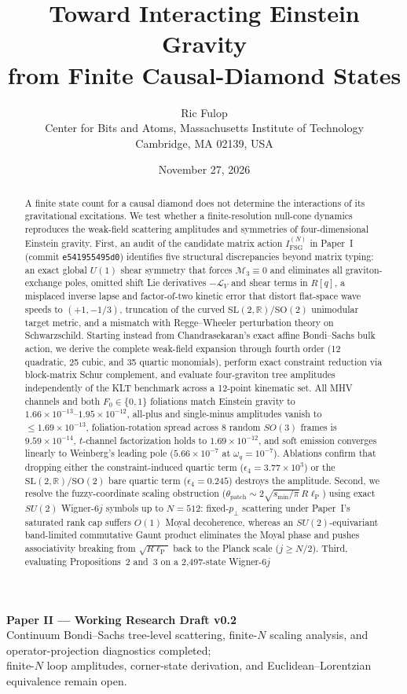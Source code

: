 \documentclass[11pt]{article}
\title{\textbf{Toward Interacting Einstein Gravity\\from Finite Causal-Diamond States}}
\author{Ric Fulop\\
Center for Bits and Atoms, Massachusetts Institute of Technology\\
Cambridge, MA 02139, USA}
\date{November 27, 2026}
\newcommand{\lP}{\ell_{\mathrm{P}}}
\newcommand{\calM}{\mathcal{M}}
\begin{document}
\maketitle

\begin{center}
\small\textbf{Paper II --- Working Research Draft v0.2}\\[2pt]
Continuum Bondi--Sachs tree-level scattering, finite-$N$ scaling analysis, and operator-projection diagnostics completed;\\
finite-$N$ loop amplitudes, corner-state derivation, and Euclidean--Lorentzian equivalence remain open.
\end{center}

\begin{abstract}
A finite state count for a causal diamond does not determine the interactions of its gravitational excitations. We test whether a finite-resolution null-cone dynamics reproduces the weak-field scattering amplitudes and symmetries of four-dimensional Einstein gravity. First, an audit of the candidate matrix action $I_{\mathrm{FSG}}^{(N)}$ in Paper~I (commit \texttt{e541955495d0}) identifies five structural discrepancies beyond matrix typing: an exact global $U(1)$ shear symmetry that forces $\calM_3 \equiv 0$ and eliminates all graviton-exchange poles, omitted shift Lie derivatives $-\mathcal{L}_V$ and shear terms in $R[q]$, a misplaced inverse lapse and factor-of-two kinetic error that distort flat-space wave speeds to $(+1, -1/3)$, truncation of the curved $\mathrm{SL}(2,\mathbb{R})/\mathrm{SO}(2)$ unimodular target metric, and a mismatch with Regge--Wheeler perturbation theory on Schwarzschild. Starting instead from Chandrasekaran's exact affine Bondi--Sachs bulk action, we derive the complete weak-field expansion through fourth order (12 quadratic, 25 cubic, and 35 quartic monomials), perform exact constraint reduction via block-matrix Schur complement, and evaluate four-graviton tree amplitudes independently of the KLT benchmark across a 12-point kinematic set. All MHV channels and both $F_0 \in \{0,1\}$ foliations match Einstein gravity to $1.66\times 10^{-13}\text{--}1.95\times 10^{-12}$, all-plus and single-minus amplitudes vanish to $\le 1.69\times 10^{-13}$, foliation-rotation spread across 8 random $SO(3)$ frames is $9.59\times 10^{-14}$, $t$-channel factorization holds to $1.69\times 10^{-12}$, and soft emission converges linearly to Weinberg's leading pole ($5.66\times 10^{-7}$ at $\omega_q=10^{-7}$). Ablations confirm that dropping either the constraint-induced quartic term ($\epsilon_4 = 3.77\times 10^3$) or the $\mathrm{SL}(2,\mathbb{R})/\mathrm{SO}(2)$ bare quartic term ($\epsilon_4 = 0.245$) destroys the amplitude. Second, we resolve the fuzzy-coordinate scaling obstruction ($\theta_{\mathrm{patch}} \sim 2\sqrt{s_{\min}/\pi}\,R\lP$) using exact $SU(2)$ Wigner-$6j$ symbols up to $N=512$: fixed-$p_\perp$ scattering under Paper~I's saturated rank cap suffers $O(1)$ Moyal decoherence, whereas an $SU(2)$-equivariant band-limited commutative Gaunt product eliminates the Moyal phase and pushes associativity breaking from $\sqrt{R\lP}$ back to the Planck scale ($j \ge N/2$). Third, evaluating Propositions~2 and~3 on a 2,497-state Wigner-$6j$ 
\end{abstract}
\end{document}
